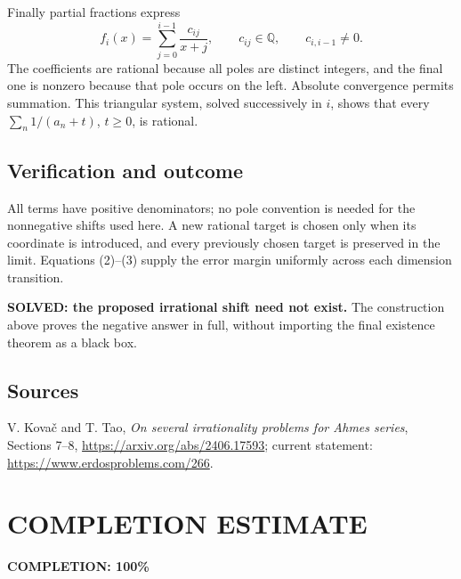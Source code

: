 Finally partial fractions express
\[
 f_i(x)=\sum_{j=0}^{i-1}\frac{c_{ij}}{x+j},
 \qquad c_{ij}\in\mathbb Q,\qquad c_{i,i-1}\ne0.
\]
The coefficients are rational because all poles are distinct integers, and the final one is nonzero because that pole occurs on the left. Absolute convergence permits summation. This triangular system, solved successively in $i$, shows that every $\sum_n1/(a_n+t)$, $t\ge0$, is rational.

\subsection{Verification and outcome}
All terms have positive denominators; no pole convention is needed for the nonnegative shifts used here. A new rational target is chosen only when its coordinate is introduced, and every previously chosen target is preserved in the limit. Equations (2)--(3) supply the error margin uniformly across each dimension transition.

\textbf{SOLVED: the proposed irrational shift need not exist.} The construction above proves the negative answer in full, without importing the final existence theorem as a black box.

\subsection{Sources}
V. Kova\v c and T. Tao, \emph{On several irrationality problems for Ahmes series}, Sections 7--8, \url{https://arxiv.org/abs/2406.17593}; current statement: \url{https://www.erdosproblems.com/266}.
\section{COMPLETION ESTIMATE}
\textbf{COMPLETION: 100\%}
